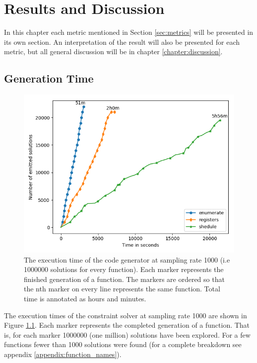 \chapter{Results and Discussion}

In this chapter each metric mentioned in Section \ref{sec:metrics} will be presented in
its own section. An interpretation of the result will also be presented for each
metric, but all general discussion will be in chapter \ref{chapter:discussion}.

\section{Generation Time}

\begin{figure}[h]
	\centering
	\includegraphics[width=\textwidth,height=0.5\textheight]{results/figures/generator_time}
	\caption{The execution time of the code generator at sampling rate 1000 (i.e 1000000 solutions for every function). Each marker represents the finished generation of a function. The markers are ordered so that the nth marker on every line represents the same function. Total time is annotated as hours and minutes.}
	\label{fig:time}
\end{figure}

The execution times of the constraint solver at sampling rate 1000 are shown in Figure
\ref{fig:time}. Each marker represents the completed generation of a function. That is,
for each marker 1000000 (one million) solutions have been explored. For a few functions
fewer than 1000 solutions were found (for a complete breakdown see appendix
\ref{appendix:function_names}).

